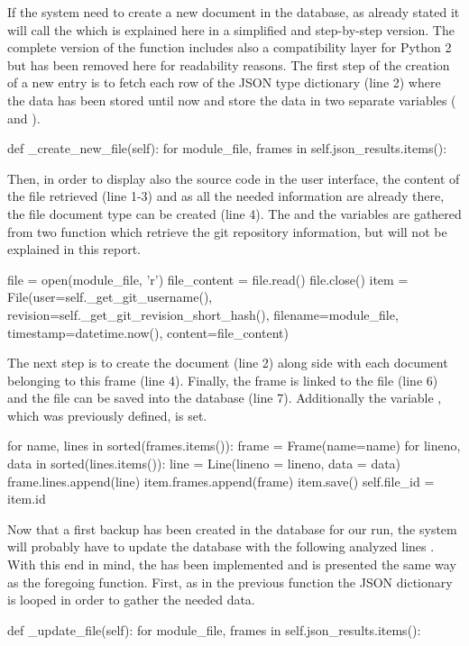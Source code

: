 If the system need to create a new document in the database, as already stated it will call the  which is explained here in a simplified and step-by-step version. The complete version of the function includes also a compatibility layer for Python 2 but has been removed here for readability reasons. The first step of the creation of a new entry is to fetch each row of the JSON type dictionary (line 2) where the data has been stored until now and store the data in two separate variables ( and ).
\begin{python}
def _create_new_file(self):
  for module_file, frames in self.json_results.items():
\end{python}
 
Then, in order to display also the source code in the user interface, the content of the file retrieved (line 1-3) and as all the needed information are already there, the file document type can be created (line 4). The  and the  variables are gathered from two function which retrieve the git repository information, but will not be explained in this report.
\begin{python}
file = open(module_file, 'r')
file_content = file.read()
file.close()
item = File(user=self._get_git_username(), revision=self._get_git_revision_short_hash(), filename=module_file, timestamp=datetime.now(), content=file_content)
\end{python}

The next step is to create the  document (line 2) along side with each  document belonging to this frame (line 4). Finally, the frame is linked to the file (line 6) and the file can be saved into the database (line 7). Additionally the variable , which was previously defined, is set.
\begin{python}
for name, lines in sorted(frames.items()):
    frame = Frame(name=name)
    for lineno, data in sorted(lines.items()):
        line = Line(lineno = lineno, data = data)
        frame.lines.append(line)
    item.frames.append(frame)
    item.save()
self.file_id = item.id
\end{python}

Now that a first backup has been created in the database for our run, the system will probably have to update the database with the following analyzed lines . With this end in mind, the  has been implemented and is presented the same way as the foregoing function. First, as in the previous function the JSON dictionary is looped in order to gather the needed data.
\begin{python}
def _update_file(self):
  for module_file, frames in self.json_results.items():
\end{python}

